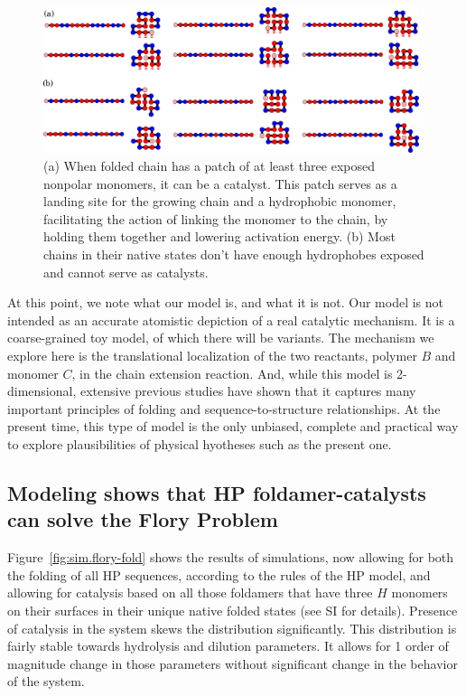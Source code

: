 \documentclass[journal=jacsat,manuscript=article,layout=twocolumn]{achemso}
\begin{document}
\begin{figure}[htb!]
  \centering
  \includegraphics[width=0.98\textwidth]{pictures/fold-cat.pdf} 
  \caption{\footnotesize{(a) 
When folded chain has a patch of at least three exposed nonpolar monomers, it can be a catalyst. 
This patch serves as a landing site for the growing chain and a hydrophobic monomer, facilitating 
the action of linking the monomer to the chain, by holding them together and lowering activation 
energy.} (b) Most chains in their native states don't have enough hydrophobes exposed and cannot 
serve as catalysts.}
  \label{fig:fold-cat}
\end{figure}

 At this point, we note what our model is, and what it is not.  Our model is not intended as an 
 accurate atomistic depiction of a real catalytic mechanism.  It is a coarse-grained toy model, of 
which there will be variants.  The mechanism we explore here is the translational localization of 
the two reactants, polymer $B$ and monomer $C$, in the chain extension reaction.  And, while this 
model is 2-dimensional, extensive previous studies have shown that it captures many important 
principles of folding and sequence-to-structure relationships.  At the present time, this type of 
model is the only unbiased, complete and practical way to explore plausibilities of physical 
hyotheses such as the present one.


\subsection{Modeling shows that HP foldamer-catalysts can solve the Flory Problem}

Figure~\ref{fig:sim.flory-fold} shows the results of simulations, now allowing for both the 
folding of all HP sequences, according to the rules of the HP model, and allowing for catalysis 
based on all those foldamers that have three $H$ monomers on their surfaces in their unique native 
folded states (see SI for details). Presence of catalysis in the system skews the distribution 
significantly. This distribution is fairly stable towards hydrolysis and dilution
parameters. It allows for 1 order of magnitude change in those parameters without significant 
change 
in the behavior of the system.
\end{document}
